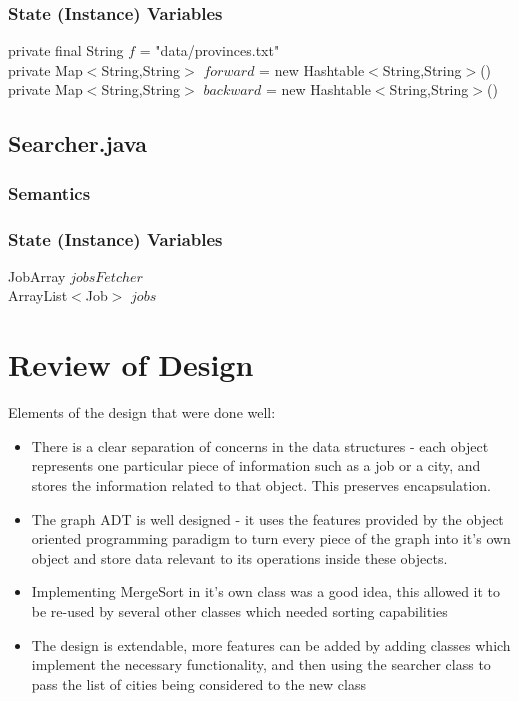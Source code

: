 \documentclass[12pt,fleqn]{article}
\begin{document}
\subsubsection*{State (Instance) Variables}
	private final String $f$ = "data/provinces.txt"\\
	private Map$<$String,String$>$ $forward$ = new Hashtable$<$String,String$>$()\\
	private Map$<$String,String$>$ $backward$ = new Hashtable$<$String,String$>$()\\


\subsection*{Searcher.java}\label{psearch}

\subsubsection*{Semantics}
\subsubsection*{State (Instance) Variables}
	JobArray $jobsFetcher$\\
	ArrayList$<$Job$>$ $ jobs$


\newpage
\section*{Review of Design}
Elements of the design that were done well:\\
\begin{itemize}
\item There is a clear separation of concerns in the data structures - each object represents one particular piece of information such as a job or a city, and stores the information related to that object. This preserves encapsulation.
\item The graph ADT is well designed - it uses the features provided by the object oriented programming paradigm to turn every piece of the graph into it’s own object and store data relevant to its operations inside these objects.
\item Implementing MergeSort in it’s own class was a good idea, this allowed it to be re-used by several other classes which needed sorting capabilities
\item The design is extendable, more features can be added by adding classes which implement the necessary functionality, and then using the searcher class to pass the list of cities being considered to the new class
\end{itemize}
\end{document}
